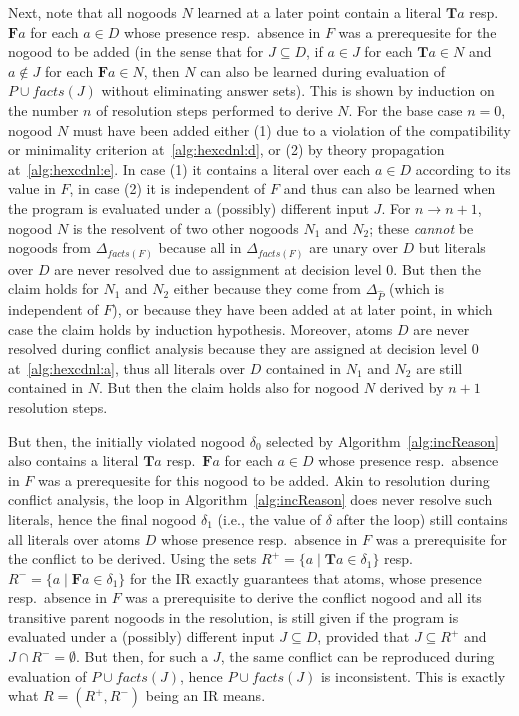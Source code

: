 \documentclass[11pt,fleqn,twoside]{article}
\newcommand{\T}{\mathbf{T}}
\newcommand{\F}{\mathbf{F}}
\newcommand{\Program}{\ensuremath{P}}
\newcommand{\ProgramP}{\ensuremath{\hat{P}}}
\newcommand{\toFacts}[1]{\mathit{facts}(#1)}
\begin{document}
{					Next, note that all nogoods $N$ learned at a later point contain a literal $\T a$ resp.~$\F a$ for each $a \in D$ whose presence resp.~absence in $F$ was a prerequesite for the nogood to be added
					(in the sense that for $J \subseteq D$, if $a \in J$ for each $\T a \in N$ and $a \not\in J$ for each $\F a \in N$, then $N$ can also be learned during evaluation of $\Program \cup \toFacts{J}$ without eliminating answer sets).
					This is shown by induction on the number $n$ of resolution steps performed to derive $N$.
						For the base case $n = 0$, nogood $N$ must have been added either
							(1) due to a violation of the compatibility or minimality criterion at~\ref{alg:hexcdnl:d},
							or (2) by theory propagation at~\ref{alg:hexcdnl:e}.
							In case (1) it contains a literal over each $a \in D$ according to its value in $F$,
							in case (2) it is independent of $F$ and thus can also be learned when the program is evaluated under a (possibly) different input $J$.
						For $n \rightarrow n + 1$, nogood $N$ is the resolvent of two other nogoods $N_1$ and $N_2$; these \emph{cannot} be nogoods from $\Delta_{\toFacts{F}}$ because all in $\Delta_{\toFacts{F}}$
						are unary over $D$ but literals over $D$ are never resolved due to assignment at decision level $0$.
							But then the claim holds for $N_1$ and $N_2$ either because they come from $\Delta_{\ProgramP}$ (which is independent of $F$), or because they have been added at at later point, in which case the claim holds by induction hypothesis.
							Moreover, atoms $D$ are never resolved during conflict analysis because they are assigned at decision level $0$ at~\ref{alg:hexcdnl:a},
							thus all literals over $D$ contained in $N_1$ and $N_2$ are still contained in $N$. But then the claim holds also for nogood $N$ derived by $n + 1$ resolution steps.

					But then, the initially violated nogood $\delta_0$ selected by Algorithm~\ref{alg:incReason}
					also contains a literal $\T a$ resp.~$\F a$ for each $a \in D$ whose presence resp.~absence in $F$ was a prerequesite for this nogood to be added.
					Akin to resolution during conflict analysis, the loop in Algorithm~\ref{alg:incReason} does never resolve such literals, hence the final nogood $\delta_1$ (i.e., the value of $\delta$ after the loop)
					still contains all literals over atoms $D$
					whose presence resp.~absence in $F$ was a prerequisite for the conflict to be derived.
					Using the sets $R^{+} = \{ a \mid \T a \in \delta_1 \}$ resp.~$R^{-} = \{ a \mid \F a \in \delta_1 \}$
					for the IR exactly guarantees that atoms, whose presence resp.~absence in $F$ was a prerequisite to derive the conflict nogood and all its transitive parent nogoods in the resolution,
					is still given if the program is evaluated under a (possibly) different input $J \subseteq D$, provided that $J \subseteq R^{+}$ and $J \cap R^{-} = \emptyset$.
					But then, for such a $J$, the same conflict can be reproduced during evaluation of $\Program \cup \toFacts{J}$, hence $\Program \cup \toFacts{J}$ is inconsistent.
					This is exactly what $R = (R^{+}, R^{-})$ being an IR means.
				}
\end{document}
